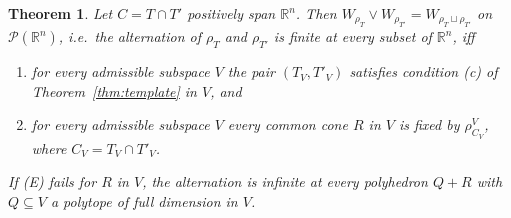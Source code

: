 \documentclass[11pt]{amsart}
\newtheorem{thm}{Theorem}[section]
\theoremstyle{definition}
\newcommand{\cP}{\mathcal P}
\begin{document}
\begin{thm}\label{thm:allsets}
Let $C=T\cap T'$ positively span $\mathbb R^n$. Then $W_{\rho_T}\vee
W_{\rho_{T'}}=W_{\rho_T\sqcup\rho_{T'}}$ on $\cP(\mathbb R^n)$, i.e.\
the alternation of $\rho_T$ and $\rho_{T'}$ is finite at every subset
of $\mathbb R^n$, iff
\begin{enumerate}
\item[(F)] for every admissible subspace $V$ the pair $(T_V,T'_V)$
satisfies condition (c) of Theorem~\ref{thm:template} in $V$, and
\item[(E)] for every admissible subspace $V$ every common cone $R$ in
$V$ is fixed by $\rho^V_{C_V}$, where $C_V=T_V\cap T'_V$.
\end{enumerate}
If (E) fails for $R$ in $V$, the alternation is infinite at every
polyhedron $Q+R$ with $Q\subseteq V$ a polytope of full dimension in
$V$.
\end{thm}
\end{document}
